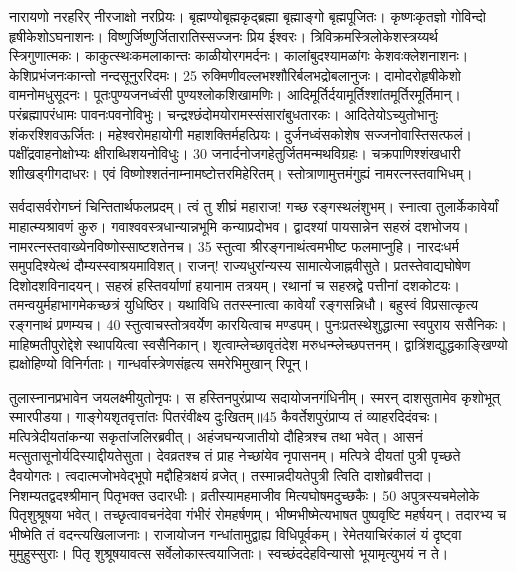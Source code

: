 नारायणो नरहरिर् नीरजाक्षो नरप्रियः।
 बृह्मण्योबृह्मकृद्ब्रह्मा बृह्माङ्गो बृह्मपूजितः।
 कृष्णःकृतज्ञो गोविन्दो हृषीकेशोऽघनाशनः।
 विष्णुर्जिष्णुर्जितारातिस्सज्जनः प्रिय ईश्वरः।
 त्रिविक्रमस्त्रिलोकेशस्त्रय्यर्थ स्त्रिगुणात्मकः।
 काकुत्स्थःकमलाकान्तः काळीयोरगमर्दनः।
 कालांबुदश्यामळांगः केशवःक्लेशनाशनः।
 केशिप्रभंजनःकान्तो नन्दसूनुररिदमः।
 25 रुक्मिणीवल्लभश्शौरिर्बलभद्रोबलानुजः।
 दामोदरोहृषीकेशो वामनोमधुसूदनः।
 पूतःपुण्यजनध्वंसी पुण्यश्लोकशिखामणिः।
 आदिमूर्तिर्दयामूर्तिश्शांतमूर्तिरमूर्तिमान्।
 परंब्रह्मापरंधामः पावनःपवनोविभुः।
 चन्द्रश्छंदोमयोरामस्संसारांबुधतारकः।
 आदितेयोऽच्युतोभानुः शंकरश्शिवऊर्जितः।
 महेश्वरोमहायोगी महाशक्तिर्महत्प्रियः।
 दुर्जनध्वंसकोशेष सज्जनोवास्तिसत्फलं।
 पक्षींद्रवाहनोक्षोभ्यः क्षीराब्धिशयनोविधुः।
 30 जनार्दनोजगहेतुर्जितमन्मथविग्रहः।
 चक्रपाणिश्शंखधारी शाीखड्गीगदाधरः।
 एवं विष्णोश्शतंनाम्नामष्टोत्तरमिहेरितम्।
 स्तोत्राणामुत्तमंगुह्यं नामरत्नस्तवाभिधम्।
 
सर्वदासर्वरोगघ्नं चिन्तितार्थफलप्रदम्।
 त्वं तु शीघ्रं महाराज! गच्छ रङ्गस्थलंशुभम्।
 स्नात्वा तुलार्केकावेर्यां माहात्म्यश्रावणं कुरु।
 गवाश्ववस्त्रधान्यान्नभूमि कन्याप्रदोभव।
 द्वादश्यां पायसान्नेन सहस्रं दशभोजय।
 नामरत्नस्तवाख्येनविष्णोस्साष्टशतेनच।
 35 स्तुत्वा श्रीरङ्गनाथंत्वमभीष्ट फलमाप्नुहि।
 नारदःधर्म समुपदिश्येत्थं दौम्यस्स्वाश्रयमाविशत्।
 राजन्! राज्यधुरांन्यस्य सामात्येजाह्नवीसुते।
 प्रतस्तेवाद्यघोषेण दिशोदशविनादयन्।
 सहस्रं हस्तिवर्याणां हयानाम तत्रयम्।
 रथानां च सहस्रद्वे पत्तीनां दशकोटयः।
 तमन्वयुर्महाभागमेकच्छत्रं युधिष्ठिर।
 यथाविधि ततस्स्नात्वा कावेर्यां रङ्गसन्निधौ।
 बहुस्वं विप्रसात्कृत्य रङ्गनाथं प्रणम्यच।
 40 स्तुत्वाचस्तोत्रवर्येण कारयित्वाच मण्डपम्।
 पुनःप्रतस्थेशुद्धात्मा स्वपुराय ससैनिकः।
 माहिष्मतीपुरोद्देशे स्थापयित्वा स्वसैनिकान्।
 शृत्वाम्लेच्छावृतंदेश मरुधन्म्लेच्छपत्तनम्।
 द्वात्रिंशद्युद्धकाङ्खिण्यो ह्यक्षोहिण्यो विनिर्गताः।
 गान्धर्वास्त्रेणसंहृत्य समरेभिमुखान् रिपून्।
 
तुलास्नानप्रभावेन जयलक्ष्मीयुतोनृपः।
 स हस्तिनपुरंप्राप्य सदायोजनगंधिनीम्।
 स्मरन् दाशसुतामेव कृशोभूत् स्मारपीडया।
 गाङ्गेयशृतवृत्तांतः पितरंवीक्ष्य दुःखितम्॥45 कैवर्तेशपुरंप्राप्य तं व्याहरदिदंवचः।
 मत्पित्रेदीयतांकन्या सकृतांजलिरब्रवीत्।
 अहंजघन्यजातीयो दौहित्रश्च तथा भवेत्।
 आसनं मत्सुतासूनोर्यदिस्याद्दीयतेसुता।
 देवव्रतश्च तं प्राह नेच्छांयेव नृपासनम्।
 मत्पित्रे दीयतां पुत्री पृच्छते दैवयोगतः।
 त्वदात्मजोभवेद्भूपो मद्दौहित्रक्षयं व्रजेत्।
 तस्मान्नदीयतेपुत्री त्विति दाशोब्रवीत्तदा।
 निशम्यतद्वदश्श्रीमान् पितृभक्त उदारधीः।
 व्रतीस्यामहमाजीव मित्यघोषमदुच्छकैः।
 50 अपुत्रस्यचमेलोके पितृशुश्रूषया भवेत्।
 तच्छृत्वावचनंदेवा गंभीरं रोमहर्षणम्।
 भीष्मभीष्मेत्यभाषत पुष्पवृष्टि महर्षयन्।
 तदारभ्य च भीष्मेति तं वदन्त्यखिलाजनाः।
 राजायोजन गन्धांतामुद्वाह्य विधिपूर्वकम्।
 रेमेतयाचिरंकालं यं दृष्ट्वा मुमुहुस्सुराः।
 पितृ शुश्रूषयावत्स सर्वेलोकास्त्वयाजिताः।
 स्वच्छंददेहविन्यासो भूयामृत्युभयं न ते।
 
